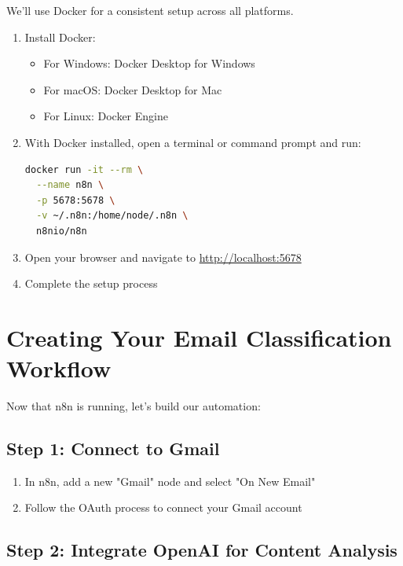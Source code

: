 We'll use Docker for a consistent setup across all platforms.

\begin{enumerate}
    \item Install Docker:
    \begin{itemize}
        \item For Windows: Docker Desktop for Windows
        \item For macOS: Docker Desktop for Mac
        \item For Linux: Docker Engine
    \end{itemize}
    \item With Docker installed, open a terminal or command prompt and run:
    \begin{lstlisting}[language=bash, label={lst:n8n-docker-run}]
docker run -it --rm \
  --name n8n \
  -p 5678:5678 \
  -v ~/.n8n:/home/node/.n8n \
  n8nio/n8n
    \end{lstlisting}
    \item Open your browser and navigate to \url{http://localhost:5678}
    \item Complete the setup process
\end{enumerate}


\section{Creating Your Email Classification Workflow}

Now that n8n is running, let's build our automation:

\subsection{Step 1: Connect to Gmail}

\begin{enumerate}
    \item In n8n, add a new "Gmail" node and select "On New Email"
    \item Follow the OAuth process to connect your Gmail account
\end{enumerate}


\subsection{Step 2: Integrate OpenAI for Content Analysis}

